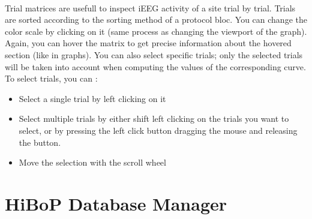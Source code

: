 \documentclass[a4paper]{article}
\begin{document}
\paragraph{} Trial matrices are usefull to inspect iEEG activity of a site trial by trial. Trials are sorted according to the sorting method of a protocol bloc. You can change the color scale by clicking on it (same process as changing the viewport of the graph). Again, you can hover the matrix to get precise information about the hovered section (like in graphs). You can also select specific trials; only the selected trials will be taken into account when computing the values of the corresponding curve. To select trials, you can :
\begin{itemize}
\item Select a single trial by left clicking on it
\item Select multiple trials by either shift left clicking on the trials you want to select, or by pressing the left click button dragging the mouse and releasing the button.
\item Move the selection with the scroll wheel
\end{itemize}
\appendix
\section{HiBoP Database Manager}\label{bddmanager}
\end{document}
